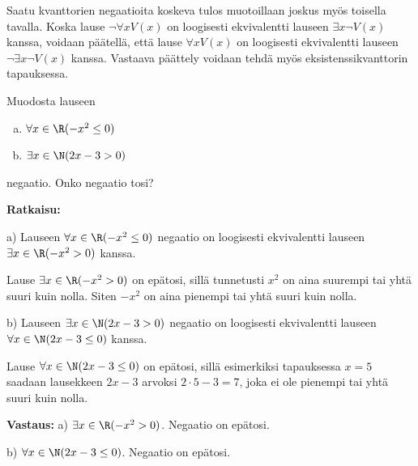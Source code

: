 \newpage

Saatu kvanttorien negaatioita koskeva tulos muotoillaan joskus myös toisella tavalla. Koska lause $\lnot \forall x V(x)$ on loogisesti ekvivalentti lauseen $\exists x\lnot V(x)$ kanssa, voidaan päätellä, että lause $\forall x V(x)$ on loogisesti ekvivalentti lauseen $\lnot \exists x\lnot V(x)$ kanssa. Vastaava päättely voidaan tehdä myös eksistenssikvanttorin tapauksessa.


\begin{esimerkki}
Muodosta lauseen
\begin{enumerate}[a)]
\item $\forall x \in \R(-x^2 \le 0)$
\item $\exists x\in \N(2x-3>0)$
\end{enumerate}
negaatio. Onko negaatio tosi?

{\bf Ratkaisu:}

a) Lauseen $\forall x \in \R(-x^2 \le 0)$ negaatio on loogisesti ekvivalentti lauseen $\exists x\in \R (-x^2 > 0)$ kanssa.

Lause $\exists x\in \R (-x^2> 0)$ on epätosi, sillä tunnetusti $x^2$ on aina suurempi tai yhtä suuri kuin nolla. Siten $-x^2$ on aina pienempi tai yhtä suuri kuin nolla.

b) Lauseen $\exists x\in \N(2x-3>0)$ negaatio on loogisesti ekvivalentti lauseen $\forall x\in \N(2x-3 \le 0)$ kanssa.

Lause $\forall x\in \N(2x-3 \le 0)$ on epätosi, sillä esimerkiksi tapauksessa $x=5$ saadaan lausekkeen $2x - 3$ arvoksi $2\cdot 5 -3 = 7$, joka ei ole pienempi tai yhtä suuri kuin nolla.

{\bf Vastaus:} a) $\exists x\in \R (-x^2 > 0)$. Negaatio on epätosi. 

b) $\forall x\in \N(2x-3 \le 0)$. Negaatio on epätosi.
\end{esimerkki}




\Harjoitustehtavat

